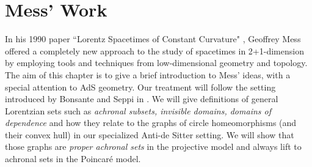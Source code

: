 \chapter{Mess' Work}\label{chapterr4}

In his 1990 paper “Lorentz Spacetimes of Constant Curvature" \cite{Mess}, Geoffrey Mess offered a completely new approach to the study of spacetimes in 2+1-dimension by employing tools and techniques from low-dimensional geometry and topology. The aim of this chapter is to give a brief introduction to Mess' ideas, with a special attention to AdS geometry. Our treatment will follow the setting introduced by Bonsante and Seppi in \cite{bonsanteseppi}. We will give definitions of general Lorentzian sets such as \textit{achronal subsets, invisible domains, domains of dependence} and how they relate to the graphs of circle homeomorphisms (and their convex hull) in our specialized Anti-de Sitter setting. We will show that those graphs are \textit{proper achronal sets} in the projective model and always lift to achronal sets in the Poincaré model.

